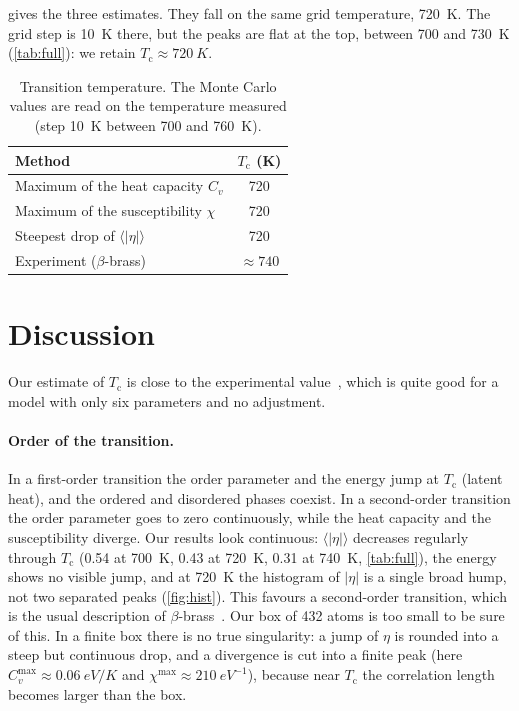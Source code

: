 \documentclass[11pt,a4paper]{article}
\newcommand{\Tc}{T_\mathrm{c}}
\begin{document}
 gives the three estimates.
They fall on the same grid temperature, \SI{720}{K}.
The grid step is \SI{10}{K} there, but the peaks are flat at the top, between 700 and \SI{730}{K} (\cref{tab:full}): we retain $\Tc \approx \SI{720}{K}$.

\begin{table}[!ht]
  \centering
  \caption{Transition temperature. The Monte Carlo values are read on the temperature measured (step \SI{10}{K} between 700 and \SI{760}{K}).}
  \label{tab:tc}
  \begin{tabular}{lc}
    \toprule
    Method & $\Tc$ (K) \\
    \midrule
    Maximum of the heat capacity $C_v$ & 720 \\
    Maximum of the susceptibility $\chi$ & 720 \\
    Steepest drop of $\langle|\eta|\rangle$ & 720 \\
    \midrule
    Experiment ($\beta$-brass)~\cite{Kuper1956} & $\approx 740$ \\
    \bottomrule
  \end{tabular}
\end{table}

\section{Discussion}
\label{sec:discussion}

Our estimate of $\Tc$ is close to the experimental value~\cite{Kuper1956}, which is quite good for a model with only six parameters and no adjustment.

\paragraph{Order of the transition.}
In a first-order transition the order parameter and the energy jump at $\Tc$ (latent heat), and the ordered and disordered phases coexist.
In a second-order transition the order parameter goes to zero continuously, while the heat capacity and the susceptibility diverge.
Our results look continuous: $\langle|\eta|\rangle$ decreases regularly through $\Tc$ (0.54 at \SI{700}{K}, 0.43 at \SI{720}{K}, 0.31 at \SI{740}{K}, \cref{tab:full}), the energy shows no visible jump, and at \SI{720}{K} the histogram of $|\eta|$ is a single broad hump, not two separated peaks (\cref{fig:hist}).
This favours a second-order transition, which is the usual description of $\beta$-brass~\cite{Kittel2005}.
Our box of 432 atoms is too small to be sure of this.
In a finite box there is no true singularity: a jump of $\eta$ is rounded into a steep but continuous drop, and a divergence is cut into a finite peak (here $C_v^\mathrm{max}\approx\SI{0.06}{eV/K}$ and $\chi^\mathrm{max}\approx\SI{210}{eV^{-1}}$), because near $\Tc$ the correlation length becomes larger than the box.
\end{document}
